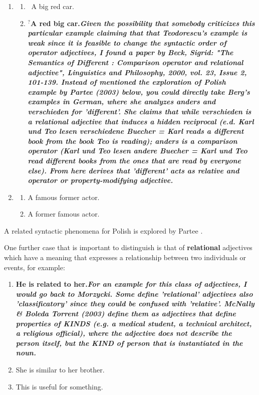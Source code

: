 \documentclass[11pt]{article}
\begin{document}
\begin{enumerate}[resume]
\item \begin{enumerate}
\item \ A big red car.
\item \textbf{$^?$A red big car.\textit{Given the possibility that somebody criticizes this particular example claiming that that Teodorescu's example is weak since it is feasible to change the syntactic order of operator adjectives, I found a paper by Beck, Sigrid: "The Semantics of Different : Comparison operator and relational adjective", Linguistics and Philosophy, 2000, vol. 23, Issue 2, 101-139. Instead of mentioned the exploration of Polish example by Partee (2003) below, you could directly take Berg's examples in German, where she analyzes anders and verschieden for 'different'. She claims that while verschieden is a relational adjective that induces a hidden reciprocal (e.d. Karl und Teo lesen verschiedene Buecher = Karl reads a different book from the book Teo is reading); anders is a comparison operator (Karl und Teo lesen andere Buecher = Karl und Teo read different books from the ones that are read by everyone else). From here derives that 'different' acts as relative and operator or property-modifying adjective. }}
\end{enumerate} 
\label{ex:car}
\item \begin{enumerate}
\item A famous former actor.
\item A former famous actor.
\end{enumerate}
\label{ex:actor}
\end{enumerate}

A related syntactic phenomena for Polish is explored by Partee .

One further case that is important to distinguish is that of \textbf{relational} adjectives which have a meaning 
that expresses a relationship between two individuals or events, for example:

\begin{enumerate}[resume]
\item \textbf{He is related to her.\textit{For an example for this class of adjectives, I would go back to Morzycki. Some define 'relational' adjectives also 'classificatory' since they could be confused with 'relative'. McNally \& Boleda Torrent (2003) define them as adjectives that define properties of KINDS (e.g. a medical student, a technical architect, a religious official), where the adjective does not describe the person itself, but the KIND of person that is instantiated in the noun. }}
\item She is similar to her brother. 
\item This is useful for something. 
\end{enumerate}
\end{document}
